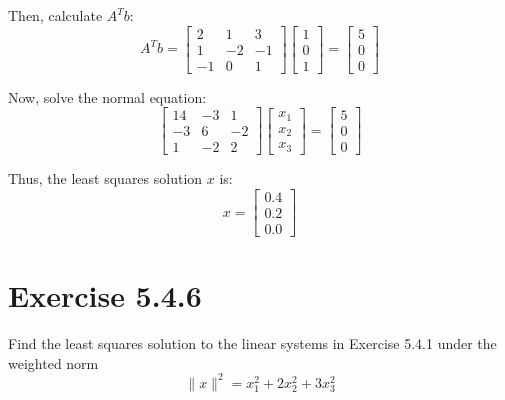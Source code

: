 \documentclass[12pt]{article}
\begin{document}
\begin{enumerate}
    Then, calculate \( A^T b \):
    \[
      A^T b = \begin{bmatrix} 2 & 1 & 3 \\ 1 & -2 & -1 \\ -1 & 0 & 1 \end{bmatrix} \begin{bmatrix} 1 \\ 0 \\ 1 \end{bmatrix} = \begin{bmatrix} 5 \\ 0 \\ 0 \end{bmatrix}
    \]

    Now, solve the normal equation:
    \[
      \begin{bmatrix} 14 & -3 & 1 \\ -3 & 6 & -2 \\ 1 & -2 & 2 \end{bmatrix} \begin{bmatrix} x_1 \\ x_2 \\ x_3 \end{bmatrix} = \begin{bmatrix} 5 \\ 0 \\ 0 \end{bmatrix}
    \]

    Thus, the least squares solution \( x \) is:
    \[
      x = \begin{bmatrix} 0.4 \\ 0.2 \\ 0.0 \end{bmatrix}
    \]
    \pagebreak

\end{enumerate}

\section*{Exercise 5.4.6}
Find the least squares solution to the linear systems in Exercise 5.4.1 under the weighted norm
\[
  \|x\|^2 = x_1^2 + 2x_2^2 + 3x_3^2
\]
\end{document}

